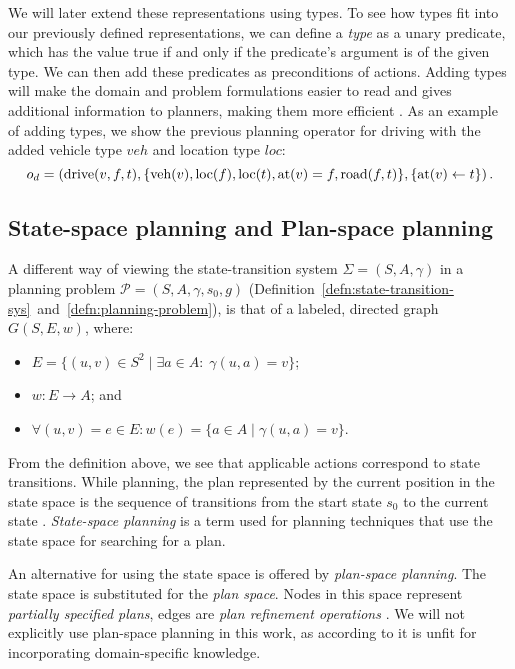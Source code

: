 We will later extend these representations using types.
To see how types fit into our previously defined representations, we can
define a \textit{type} as a unary predicate, which has the value true
if and only if the predicate's argument is of the given type.
We can then add these predicates as preconditions of actions.
Adding types will make the domain and problem formulations
easier to read and gives additional information
to planners, making them more efficient \citep[Section 2.4.1]{Ghallab2004}. As an example of adding types, we show the previous planning operator for driving with the added vehicle type $veh$ and location type $loc$:
$$o_d = \left(\textrm{drive}(v, f, t), \{\textrm{veh}(v), \textrm{loc}(f), \textrm{loc}(t), \textrm{at}(v) = f, \textrm{road}(f, t)\}, \{\textrm{at}(v) \leftarrow t\}\right).$$

\subsection{State-space planning and Plan-space planning}

A different way of viewing the state-transition system $\Sigma = (S, A, \gamma)$ in a
planning problem $\mathcal{P} = (S, A, \gamma, s_0, g)$ (Definition~\ref{defn:state-transition-sys}~and~\ref{defn:planning-problem}), is that of a labeled, directed graph $G(S, E, w)$, where:
\begin{itemize}
\item $E = \{(u, v) \in S^2 \;|\; \exists a \in A : \; \gamma(u, a) = v\}$;
\item $w: E \to A$; and
\item $\forall (u, v) = e \in E : w(e) = \{a \in A \;|\; \gamma(u, a) = v\}$. 
\end{itemize}
From the definition above, we see that applicable actions correspond to state transitions. While planning, the plan represented by the current position in
the state space is the sequence of transitions from the start
state $s_0$ to the current state \citep[Section~4.1]{Ghallab2004}.
\textit{State-space planning} is a term used for planning techniques
that use the state space for searching for a plan.

An alternative for using the state space is offered by \textit{plan-space planning}.
The state space is substituted for the \textit{plan space}.
Nodes in this space represent \textit{partially specified plans},
edges are \textit{plan refinement operations} \citep[Section~5.1]{Ghallab2004}.
We will not explicitly use plan-space planning in this work, as according to
\citet[Section~5.6]{Ghallab2004} it is unfit for
incorporating domain-specific knowledge.

